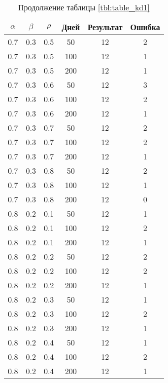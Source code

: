 \begin{table}[h]
	\begin{center}
        \begin{threeparttable}
        \captionsetup{justification=raggedright,singlelinecheck=off}
		\caption*{Продолжение таблицы \ref{tbl:table_kd1}}
		\begin{tabular}{|c|c|c|c|c|c|}
  	\hline
	$\alpha$ & $\beta$ & $\rho$ & Дней & Результат & Ошибка \\\hline
	0.7 &  0.3 &  0.5 &   50 &    12 &     2 \\
	0.7 &  0.3 &  0.5 &  100 &    12 &     1 \\
	0.7 &  0.3 &  0.5 &  200 &    12 &     1 \\
   \hline
	0.7 &  0.3 &  0.6 &   50 &    12 &     3 \\
	0.7 &  0.3 &  0.6 &  100 &    12 &     2 \\
	0.7 &  0.3 &  0.6 &  200 &    12 &     1 \\
   \hline
	0.7 &  0.3 &  0.7 &   50 &    12 &     2 \\
	0.7 &  0.3 &  0.7 &  100 &    12 &     2 \\
	0.7 &  0.3 &  0.7 &  200 &    12 &     1 \\
   \hline
	0.7 &  0.3 &  0.8 &   50 &    12 &     2 \\
	0.7 &  0.3 &  0.8 &  100 &    12 &     1 \\
	0.7 &  0.3 &  0.8 &  200 &    12 &     0 \\
   \hline
	0.8 &  0.2 &  0.1 &   50 &    12 &     1 \\
	0.8 &  0.2 &  0.1 &  100 &    12 &     2 \\
	0.8 &  0.2 &  0.1 &  200 &    12 &     1 \\
   \hline
	0.8 &  0.2 &  0.2 &   50 &    12 &     2 \\
	0.8 &  0.2 &  0.2 &  100 &    12 &     2 \\
	0.8 &  0.2 &  0.2 &  200 &    12 &     1 \\
   \hline
	0.8 &  0.2 &  0.3 &   50 &    12 &     1 \\
	0.8 &  0.2 &  0.3 &  100 &    12 &     2 \\
	0.8 &  0.2 &  0.3 &  200 &    12 &     1 \\
   \hline
	0.8 &  0.2 &  0.4 &   50 &    12 &     1 \\
	0.8 &  0.2 &  0.4 &  100 &    12 &     2 \\
	0.8 &  0.2 &  0.4 &  200 &    12 &     1 \\

\end{tabular}
\end{threeparttable}
\end{center}
\end{table}
